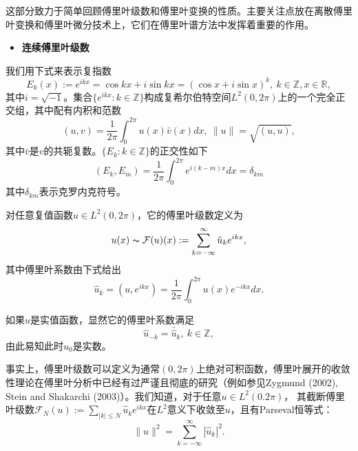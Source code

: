     这部分致力于简单回顾傅里叶级数和傅里叶变换的性质。主要关注点放在离散傅里叶变换和傅里叶微分技术上，它们在傅里叶谱方法中发挥着重要的作用。
        
\begin{itemize}
  \item  \textbf{连续傅里叶级数}
\end{itemize}        

    我们用下式来表示复指数    
\begin{equation*}
    E_k(x) := e^{ikx} = \cos kx + i\sin kx = (\cos x + i\sin x)^k, \   k \in \mathbb{Z},x \in \mathbb{R},
\end{equation*}    
    其中$i = \sqrt{-1}$。集合$\{ e^{ikx}:k \in \mathbb{Z} \}$构成复希尔伯特空间$L^2 (0,2\pi)$上的一个完全正交组，其中配有内积和范数    
\begin{equation*}
    (u,v) = \dfrac{1}{2\pi} \int_0^{2\pi} u(x)\bar{v}(x)dx, \  
    \| u \| = \sqrt{(u,u)},
\end{equation*}    
    其中$\bar{v}$是$v$的共轭复数。$\{ E_k:k \in \mathbb{Z}\}$的正交性如下    
\begin{equation}
    (E_k,E_m) = \dfrac{1}{2\pi} \int_0^{2\pi} e^{i(k - m)x} dx = \delta_{km}
\label{6.2.1}    
\end{equation}    
    其中$\delta_{km}$表示克罗内克符号。
    
    对任意复值函数$u \in L^2(0,2\pi)$，它的傅里叶级数定义为    
\begin{equation}
    u(x) \thicksim \mathcal{F} (u)(x) := \sum_{k = -\infty}^{\infty} \hat{u}_ke^{ikx} ,
    \label{6.2.2}
\end{equation}    
    其中傅里叶系数由下式给出    
\begin{equation}
    \hat{u}_k = (u,e^{ikx}) = \dfrac{1}{2\pi} \int_0^{2\pi} u(x)e^{-ikx} dx .
    \label{6.2.3}
\end{equation}    

    如果$u$是实值函数，显然它的傅里叶系数满足    
\begin{equation}
    \hat{u}_{-k} = \bar{\hat{u}}_k, \   k \in \mathbb{Z},
    \label{6.2.4}
\end{equation}    
    由此易知此时$\hat{u}_0$是实数。
    
    事实上，傅里叶级数可以定义为通常$(0,2\pi)$上绝对可积函数，傅里叶展开的收敛性理论在傅里叶分析中已经有过严谨且彻底的研究（例如参见Zygmund (2002), Stein and Shakarchi (2003)）。我们知道，对于任意$u \in L^2(0.2\pi)$， 其截断傅里叶级数$\mathcal{F}_N(u) := \sum_{|k| \leq N} \hat{u}_k e^{ikx}$在$L^2$意义下收敛至$u$，且有Parseval恒等式：   
\begin{equation}
    \| u \|^2 = \sum_{k = -\infty}^{\infty} |\hat{u}_k|^2.
    \label{6.2.5}
\end{equation}       

